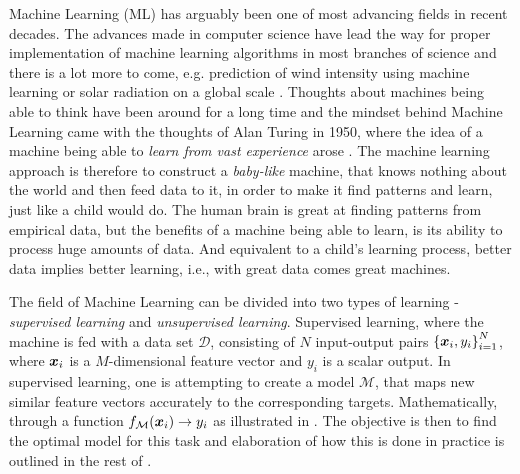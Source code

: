 \mainmatter %
\pagestyle{mainmatter}
\thispagestyle{empty}

Machine Learning (ML) has arguably been one of most advancing fields in recent decades. The advances made in computer science have lead the way for proper implementation of machine learning algorithms in most branches of science and there is a lot more to come, e.g. prediction of wind intensity using machine learning \citep{Aristides_machinelearning} or solar radiation on a global scale \citep{ertugrul2015a}. Thoughts about machines being able to think have been around for a long time and the mindset behind Machine Learning came with the thoughts of Alan Turing in 1950, where the idea of a machine being able to \emph{learn from vast experience} arose \citep{Turing1950-TURCMA}. The machine learning approach is therefore to construct a \emph{baby-like} machine, that knows nothing about the world and then feed data to it, in order to make it find patterns and learn, just like a child would do. The human brain is great at finding patterns from empirical data, but the benefits of a machine being able to learn, is its ability to process huge amounts of data. And equivalent to a child's learning process, better data implies better learning, i.e., with great data comes great machines.

The field of Machine Learning can be divided into two types of learning - \emph{supervised learning} and \emph{unsupervised learning}. Supervised learning, where the machine is fed with a data set $\mathcal{D}$, consisting of $N$ input-output pairs $\left\{ {\bm{x}_i,y_i} \right\}_{i=1}^N$, where $\bm{x}_i$ is a $M$-dimensional feature vector and $y_i$ is a scalar output. In supervised learning, one is attempting to create a model $\mathcal{M}$, that maps new similar feature vectors accurately to the corresponding targets. Mathematically, through a function $f_{\mathcal{M}}\qty(\bm{x}_i) \to y_i$ as illustrated in . The objective is then to find the optimal model for this task and elaboration of how this is done in practice is outlined in the rest of . 

